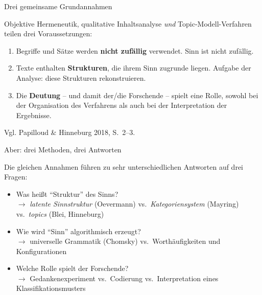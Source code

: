 \documentclass[aspectratio=169,11pt]{beamer}
\let\oldemph\emph
\renewcommand{\emph}[1]{{\color{solCyan}\oldemph{#1}}}
\let\oldtextbf\textbf
\renewcommand{\textbf}[1]{{\color{solBase3}\oldtextbf{#1}}}
\begin{document}
\begin{frame}{Drei gemeinsame Grundannahmen}

  Objektive Hermeneutik, qualitative Inhaltsanalyse \emph{und}
  Topic-Modell-Verfahren teilen drei Voraussetzungen:

  \vfill
  \begin{enumerate}
    \item Begriffe und Sätze werden \textbf{nicht zufällig} verwendet.
          Sinn ist nicht zufällig.
    \vfill
    \item Texte enthalten \textbf{Strukturen}, die ihrem Sinn zugrunde
          liegen. Aufgabe der Analyse: diese Strukturen rekonstruieren.
    \vfill
    \item Die \textbf{Deutung} – und damit der/die Forschende – spielt
          eine Rolle, sowohl bei der Organisation des Verfahrens als auch
          bei der Interpretation der Ergebnisse.
  \end{enumerate}

  \vfill
  \footnotesize\color{black!60}
  Vgl. Papilloud \& Hinneburg 2018, S.~2–3.

\end{frame}

\begin{frame}{Aber: drei Methoden, drei Antworten}

  Die gleichen Annahmen führen zu sehr unterschiedlichen Antworten
  auf drei Fragen:

  \vfill
  \begin{itemize}
    \item Was heißt \enquote{Struktur} des Sinns? \\
          $\rightarrow$ \textit{latente Sinnstruktur} (Oevermann) vs.\
          \textit{Kategoriensystem} (Mayring) vs.\
          \textit{topics} (Blei, Hinneburg)
    \vfill
    \item Wie wird \enquote{Sinn} algorithmisch erzeugt? \\
          $\rightarrow$ universelle Grammatik (Chomsky) vs.\
          Worthäufigkeiten und Konfigurationen
    \vfill
    \item Welche Rolle spielt der Forschende? \\
          $\rightarrow$ Gedankenexperiment vs.\
          Codierung vs.\ Interpretation eines Klassifikationsmusters
  \end{itemize}

\end{frame}
\end{document}

